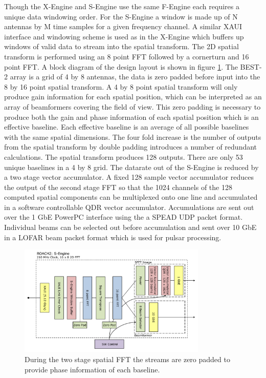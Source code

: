 \documentclass[useAMS,macros,usenatbib]{mn2e}
\begin{document}
Though the X-Engine and S-Engine use the same F-Engine each requires a unique data windowing order.
For the S-Engine a window is made up of N antennas by M time samples for a given frequency channel.
A similar XAUI interface and windowing scheme is used as in the X-Engine which buffers up windows of valid data to stream into the spatial transform.
The 2D spatial transform is performed using an 8 point FFT followed by a cornerturn and 16 point FFT.
A block diagram of the design layout is shown in figure \ref{fig:seng_block}.
The BEST-2 array is a grid of 4 by 8 antennas, the data is zero padded before input into the 8 by 16 point spatial transform.
A 4 by 8 point spatial transform will only produce gain information for each spatial position, which can be interpreted as an array of beamformers covering the field of view.
This zero padding is necessary to produce both the gain and phase information of each spatial position which is an effective baseline.
Each effective baseline is an average of all possible baselines with the same spatial dimensions.
The four fold increase is the number of outputs from the spatial transform by double padding introduces a number of redundant calculations.
The spatial transform produces 128 outputs.
There are only 53 unique baselines in a 4 by 8 grid.
The datarate out of the S-Engine is reduced by a two stage vector accumulator.
A fixed 128 sample vector accumulator reduces the output of the second stage FFT so that the 1024 channels of the 128 computed spatial components can be multiplexed onto one line and accumulated in a software controllable QDR vector accumulator.
Accumulations are sent out over the 1 GbE PowerPC interface using the a SPEAD UDP packet format.
Individual beams can be selected out before accumulation and sent over 10 GbE in a LOFAR beam packet format which is used for pulsar processing.

\begin{figure}
    \centering
    \includegraphics[width=0.8\textwidth]{graphics/crop_sengine_block.pdf}
    \caption{During the two stage spatial FFT the streams are zero padded to provide phase information of each baseline.}
    \label{fig:seng_block}
\end{figure}
\end{document}
